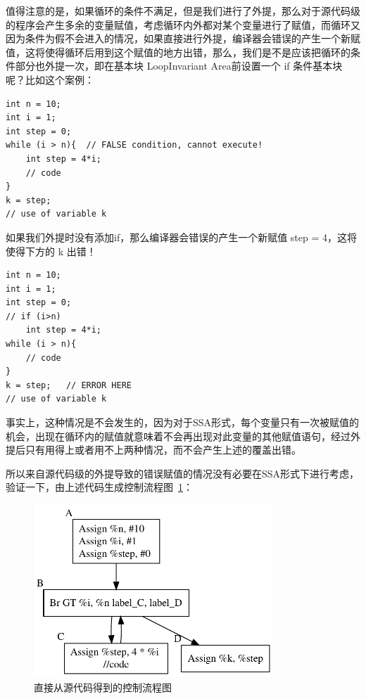 值得注意的是，如果循环的条件不满足，但是我们进行了外提，那么对于源代码级的程序会产生多余的变量赋值，考虑循环内外都对某个变量进行了赋值，而循环又因为条件为假不会进入的情况，如果直接进行外提，编译器会错误的产生一个新赋值，这将使得循环后用到这个赋值的地方出错，那么，我们是不是应该把循环的条件部分也外提一次，即在基本块 LoopInvariant Area前设置一个 if 条件基本块呢？比如这个案例：

\begin{verbatim}
int n = 10;
int i = 1;
int step = 0;
while (i > n){  // FALSE condition, cannot execute!
	int step = 4*i; 
	// code
}
k = step;
// use of variable k
\end{verbatim}

如果我们外提时没有添加if，那么编译器会错误的产生一个新赋值 step = 4，这将使得下方的 k 出错！

\begin{verbatim}
int n = 10;
int i = 1;
int step = 0;
// if (i>n)
    int step = 4*i;
while (i > n){ 
	// code
}
k = step;   // ERROR HERE
// use of variable k

\end{verbatim}

事实上，这种情况是不会发生的，因为对于SSA形式，每个变量只有一次被赋值的机会，出现在循环内的赋值就意味着不会再出现对此变量的其他赋值语句，经过外提后只有用得上或者用不上两种情况，而不会产生上述的覆盖出错。

所以来自源代码级的外提导致的错误赋值的情况没有必要在SSA形式下进行考虑，验证一下，由上述代码生成控制流程图~\ref{fig:motion0}：

\begin{figure}[htb]
  \centering
  \includegraphics[width=0.8\textwidth]{figures/codeMotion.pdf}
  \caption{直接从源代码得到的控制流程图}
  \label{fig:motion0}
\end{figure}

